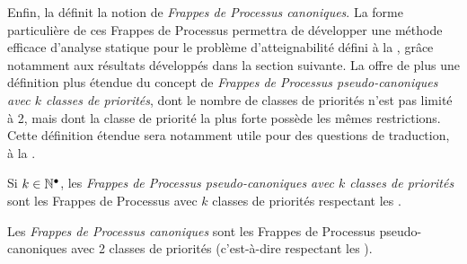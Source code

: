 Enfin, la  définit la notion de \emph{Frappes de Processus canoniques}.
La forme particulière de ces Frappes de Processus permettra de développer une méthode efficace
d'analyse statique pour le problème d'atteignabilité défini à la ,
grâce notamment aux résultats développés dans la section suivante.
La  offre de plus une définition plus étendue du concept
de \emph{Frappes de Processus pseudo-canoniques avec $k$ classes de priorités},
dont le nombre de classes de priorités n'est pas limité à 2,
mais dont la classe de priorité la plus forte possède les mêmes restrictions.
Cette définition étendue sera notamment utile pour des questions de traduction,
à la .

\begin{definition}
  Si $k \in \mathbb{N}^\bullet$, les \emph{Frappes de Processus pseudo-canoniques avec $k$ classes de priorités}
  sont les Frappes de Processus avec $k$ classes de priorités
  respectant les \allcr.
\end{definition}

\begin{definition}
  Les \emph{Frappes de Processus canoniques}
  sont les Frappes de Processus pseudo-canoniques avec 2 classes de priorités
  (c'est-à-dire respectant les \allcr).
\end{definition}




